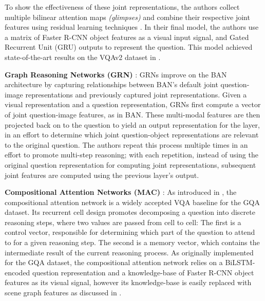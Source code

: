 
To show the effectiveness of these joint representations, the authors collect multiple bilinear attention maps \textit{(glimpses)} and combine their respective joint features using residual learning techniques \cite{kim2016multimodal}. In their final model, the authors use a matrix of Faster R-CNN object features as a visual input signal, and Gated Recurrent Unit (GRU) \cite{cho2014learning} outputs to represent the question. This model achieved state-of-the-art results on the VQAv2 dataset in \citeyear{kim2018bilinear}. 

\textbf{Graph Reasoning Networks (GRN)} \cite{guo2019bilinear}: GRNs improve on the BAN architecture by capturing relationships between BAN's default joint question-image representations and previously captured joint representations. Given a visual representation and a question representation, GRNs first compute a vector of joint question-image features, as in BAN. These multi-modal features are then projected back on to the question to yield an output representation for the layer, in an effort to determine which joint question-object representations are relevant to the original question. The authors repeat this process multiple times in an effort to promote multi-step reasoning; with each repetition, instead of using the original question representation for computing joint representations, subsequent joint features are computed using the previous layer's output.


\textbf{Compositional Attention Networks (MAC)} \cite{hudson2018compositional}: As introduced in \subsectionautorefname{ \ref{subsection:attention_methods_for_vqa}}, the compositional attention network is a widely accepted VQA baseline for the GQA dataset. Its recurrent cell design promotes decomposing a question into discrete reasoning steps, where two values are passed from cell to cell: The first is a control vector, responsible for determining which part of the question to attend to for a given reasoning step. The second is a memory vector, which contains the intermediate result of the current reasoning process. As originally implemented for the GQA dataset, the compositional attention network relies on a BiLSTM-encoded question representation and a knowledge-base of Faster R-CNN \cite{ren2016faster} object features as its visual signal, however its knowledge-base is easily replaced with scene graph features as discussed in \sectionautorefname{ \ref{section:performance_evaluation}}.

